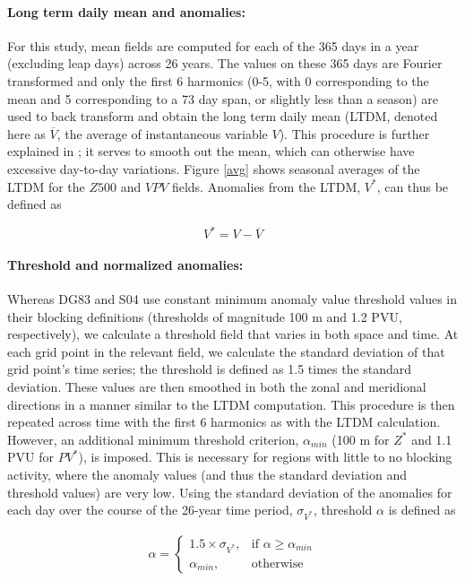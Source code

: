 \documentclass[smallextended]{svjour3}       %
\numberwithin{equation}{section}
\begin{document}
\paragraph{Long term daily mean and anomalies:}  For this study, mean fields are computed for each of the 365 days in a year (excluding leap days) across 26 years. The values on these 365 days are Fourier transformed and only the first 6 harmonics (0-5, with 0 corresponding to the mean and 5 corresponding to a 73 day span, or slightly less than a season) are used to back transform and obtain the long term daily mean (LTDM, denoted here as $\overline{V}$, the average of instantaneous variable $V$). This procedure is further explained in \cite{grotjahn_synoptic_2017}; it serves to smooth out the mean, which can otherwise have excessive day-to-day variations. Figure \ref{avg} shows seasonal averages of the LTDM for the $Z500$ and $VPV$ fields. Anomalies from the LTDM, $V^*$, can thus be defined as 

\begin{equation}
V^* = V-\overline{V}
\end{equation}

\paragraph{Threshold and normalized anomalies:} Whereas DG83 and S04 use constant minimum anomaly value threshold values in their blocking definitions (thresholds of magnitude 100 m and 1.2 PVU, respectively), we calculate a threshold field that varies in both space and time. At each grid point in the relevant field, we calculate the standard deviation of that grid point's time series; the threshold is defined as 1.5 times the standard deviation. These values are then smoothed in both the zonal and meridional directions in a manner similar to the LTDM computation. This procedure is then repeated across time with the first 6 harmonics as with the LTDM calculation. However, an additional minimum threshold criterion, $\alpha_{min}$ (100 m for $Z^*$ and 1.1 PVU for $PV^*$), is imposed. This is necessary for regions with little to no blocking activity, where the anomaly values (and thus the standard deviation and threshold values) are very low. Using the standard deviation of the anomalies for each day over the course of the 26-year time period, $\sigma_{V^*}$, threshold $\alpha$ is defined as 

\begin{eqnarray}
\alpha =  
\begin{cases}
    1.5\times \sigma_{V^*},& \text{if } \alpha\geq \alpha_{min}\\
    \alpha_{min},              & \text{otherwise}
\end{cases}
\end{eqnarray}
\end{document}
